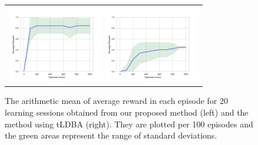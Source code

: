\documentclass[letterpaper, 10 pt, conference]{ieeeconf}  %
\begin{document}
\begin{figure}[tbp]
 \centering
 \begin{tabular}{c}
  \begin{minipage}{0.5\hsize}
     \centering
     \includegraphics[bb=0 0 461 346, height = 3.4cm, width=4.2cm]{ep_1000_it_10000_MDP3_gamma_095_re2_ini22_nts_c095_20times_no2.png}
 \end{minipage}

 \begin{minipage}{0.5\hsize}
   \centering
   \includegraphics[bb=0 0 461 346, height = 3.4cm, width=4.2cm]{ep_1000_it_10000_MDP3_gamma_095_nts_c095_ldba_20times.png}
 \end{minipage}
\end{tabular}
 \caption{The arithmetic mean of average reward in each episode for 20 learning sessions obtained from our proposed method (left) and the method using tLDBA (right). They are plotted per 100 episodes and the green areas represent the range of standard deviations. }
 \label{result}
\end{figure}
\end{document}
